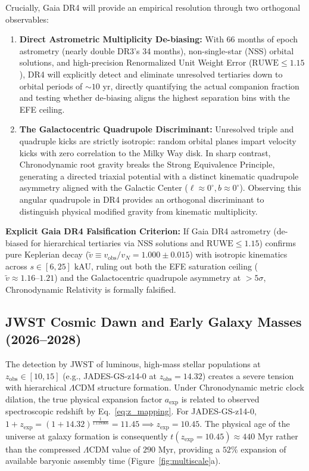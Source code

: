 \documentclass[aps,prd,reprint,superscriptaddress,nofootinbib,twocolumn,floatfix]{revtex4-2}
\begin{document}
Crucially, Gaia DR4 will provide an empirical resolution through two orthogonal observables:
\begin{enumerate}\setlength{\itemsep}{1pt}\setlength{\parskip}{0pt}
    \item \textbf{Direct Astrometric Multiplicity De-biasing:} With 66 months of epoch astrometry (nearly double DR3's 34 months), non-single-star (NSS) orbital solutions, and high-precision Renormalized Unit Weight Error ($\text{RUWE} \le 1.15$), DR4 will explicitly detect and eliminate unresolved tertiaries down to orbital periods of $\sim 10\text{ yr}$, directly quantifying the actual companion fraction and testing whether de-biasing aligns the highest separation bins with the EFE ceiling.
    \item \textbf{The Galactocentric Quadrupole Discriminant:} Unresolved triple and quadruple kicks are strictly isotropic: random orbital planes impart velocity kicks with zero correlation to the Milky Way disk. In sharp contrast, Chronodynamic root gravity breaks the Strong Equivalence Principle, generating a directed triaxial potential with a distinct kinematic quadrupole asymmetry aligned with the Galactic Center ($\ell \approx 0^\circ, b \approx 0^\circ$). Observing this angular quadrupole in DR4 provides an orthogonal discriminant to distinguish physical modified gravity from kinematic multiplicity.
\end{enumerate}

\textbf{Explicit Gaia DR4 Falsification Criterion:} If Gaia DR4 astrometry (de-biased for hierarchical tertiaries via NSS solutions and $\text{RUWE} \le 1.15$) confirms pure Keplerian decay ($\tilde{v} \equiv v_{\text{obs}}/v_N = 1.000 \pm 0.015$) with isotropic kinematics across $s \in [6, 25]\text{ kAU}$, ruling out both the EFE saturation ceiling ($\tilde{v} \approx 1.16\text{--}1.21$) and the Galactocentric quadrupole asymmetry at $>5\sigma$, Chronodynamic Relativity is formally falsified.

\subsection{JWST Cosmic Dawn and Early Galaxy Masses (2026--2028)}
The detection by JWST of luminous, high-mass stellar populations at $z_{\text{obs}} \in [10, 15]$ (e.g., JADES-GS-z14-0 at $z_{\text{obs}} = 14.32$) creates a severe tension with hierarchical $\Lambda$CDM structure formation. Under Chronodynamic metric clock dilation, the true physical expansion factor $a_{\text{exp}}$ is related to observed spectroscopic redshift by Eq.~\eqref{eq:z_mapping}. For JADES-GS-z14-0, $1 + z_{\text{exp}} = (1 + 14.32)^{\frac{1}{1.119366}} = 11.45 \implies z_{\text{exp}} = 10.45$. The physical age of the universe at galaxy formation is consequently $t(z_{\text{exp}} = 10.45) \approx 440\text{ Myr}$ rather than the compressed $\Lambda$CDM value of $290\text{ Myr}$, providing a $52\%$ expansion of available baryonic assembly time (Figure~\ref{fig:multiscale}a).
\end{document}

